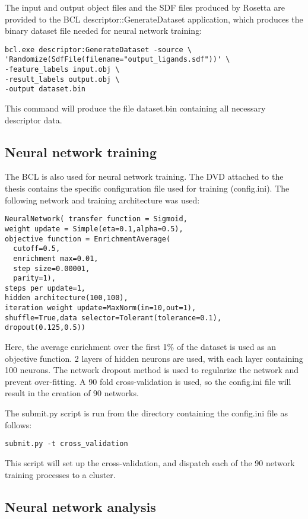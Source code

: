The input and output object files and the \ac{SDF} files produced by Rosetta are provided to the \ac{BCL} descriptor::GenerateDataset application, which produces the binary dataset file needed for neural network training:
\singlespace
\begin{verbatim}
bcl.exe descriptor:GenerateDataset -source \
'Randomize(SdfFile(filename="output_ligands.sdf"))' \
-feature_labels input.obj \
-result_labels output.obj \
-output dataset.bin
\end{verbatim}
\doublespace

This command will produce the file dataset.bin containing all necessary descriptor data.

\subsection{Neural network training}

The \ac{BCL} is also used for neural network training.
The DVD attached to the thesis contains the specific configuration file used for training (config.ini).
The following network and training architecture was used:
\singlespace
\begin{verbatim}
NeuralNetwork( transfer function = Sigmoid,
weight update = Simple(eta=0.1,alpha=0.5),
objective function = EnrichmentAverage(
  cutoff=0.5,
  enrichment max=0.01,
  step size=0.00001,
  parity=1),
steps per update=1, 
hidden architecture(100,100),
iteration weight update=MaxNorm(in=10,out=1),
shuffle=True,data selector=Tolerant(tolerance=0.1),
dropout(0.125,0.5))
\end{verbatim}
\doublespace
Here, the average enrichment over the first 1\% of the dataset is used as an objective function.
2 layers of hidden neurons are used, with each layer containing 100 neurons. 
The network dropout method\citep{Hinton:2012tv} is used to regularize the network and prevent over-fitting.
A 90 fold cross-validation is used, so the config.ini file will result in the creation of 90 networks.

The submit.py script is run from the directory containing the config.ini file as follows:
\singlespace
\begin{verbatim}
submit.py -t cross_validation
\end{verbatim}
\doublespace
This script will set up the cross-validation, and dispatch each of the 90 network training processes to a cluster.
\subsection{Neural network analysis}


